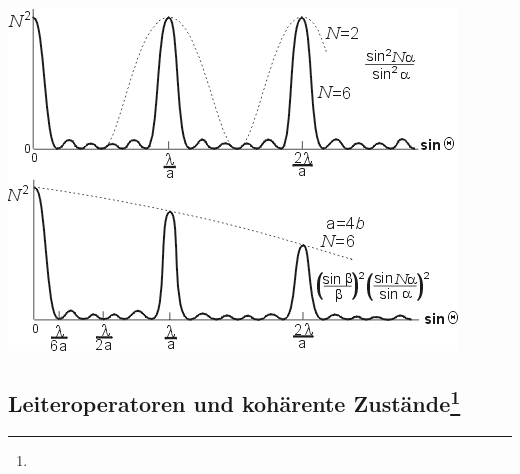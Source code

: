 \documentclass[12pt,a4paper]{article}
\renewcommand{\=}[1]{\stackrel{#1}{=}}
\theoremstyle{definition}
\theoremstyle{remark}
\begin{document}
\begin{center}
\begin{minipage}[t]{.4\linewidth}
\includegraphics[width=\linewidth]{pic/gitter.png}
\end{minipage}
\end{center}


\subsection[Leiteroperatoren und kohärente Zustände]{Leiteroperatoren und kohärente Zustände\let\thefootnote\relax\footnote{}}
\end{document}
